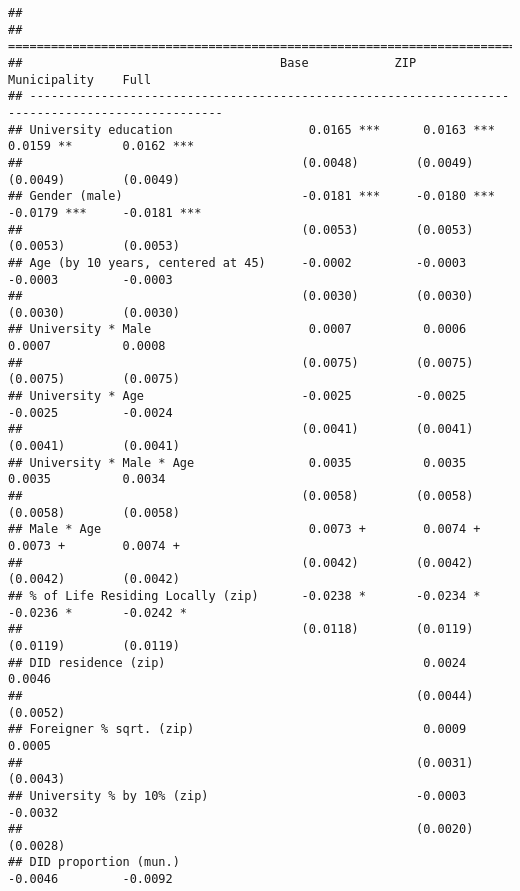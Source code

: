 \documentclass[
]{article}
\begin{document}
\begin{verbatim}
## 
## =================================================================================================
##                                    Base            ZIP             Municipality    Full          
## -------------------------------------------------------------------------------------------------
## University education                   0.0165 ***      0.0163 ***      0.0159 **       0.0162 ***
##                                       (0.0048)        (0.0049)        (0.0049)        (0.0049)   
## Gender (male)                         -0.0181 ***     -0.0180 ***     -0.0179 ***     -0.0181 ***
##                                       (0.0053)        (0.0053)        (0.0053)        (0.0053)   
## Age (by 10 years, centered at 45)     -0.0002         -0.0003         -0.0003         -0.0003    
##                                       (0.0030)        (0.0030)        (0.0030)        (0.0030)   
## University * Male                      0.0007          0.0006          0.0007          0.0008    
##                                       (0.0075)        (0.0075)        (0.0075)        (0.0075)   
## University * Age                      -0.0025         -0.0025         -0.0025         -0.0024    
##                                       (0.0041)        (0.0041)        (0.0041)        (0.0041)   
## University * Male * Age                0.0035          0.0035          0.0035          0.0034    
##                                       (0.0058)        (0.0058)        (0.0058)        (0.0058)   
## Male * Age                             0.0073 +        0.0074 +        0.0073 +        0.0074 +  
##                                       (0.0042)        (0.0042)        (0.0042)        (0.0042)   
## % of Life Residing Locally (zip)      -0.0238 *       -0.0234 *       -0.0236 *       -0.0242 *  
##                                       (0.0118)        (0.0119)        (0.0119)        (0.0119)   
## DID residence (zip)                                    0.0024                          0.0046    
##                                                       (0.0044)                        (0.0052)   
## Foreigner % sqrt. (zip)                                0.0009                          0.0005    
##                                                       (0.0031)                        (0.0043)   
## University % by 10% (zip)                             -0.0003                         -0.0032    
##                                                       (0.0020)                        (0.0028)   
## DID proportion (mun.)                                                 -0.0046         -0.0092    

\end{verbatim}
\end{document}
